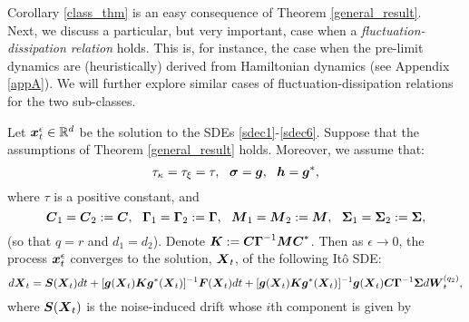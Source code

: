 Corollary \ref{class_thm} is an easy consequence of Theorem \ref{general_result}. \\

Next, we discuss a particular, but very important, case when a {\it fluctuation-dissipation relation} holds.  This is, for instance, the case when the pre-limit dynamics are (heuristically) derived from Hamiltonian dynamics (see Appendix \ref{appA}). We will further explore similar cases of fluctuation-dissipation relations for the two sub-classes.

\begin{corollary} \label{gen_fdt}
Let $\boldsymbol{x}^\epsilon_{t} \in \mathbb{R}^{d}$ be the solution to the SDEs \eqref{sdec1}-\eqref{sdec6}. Suppose that the assumptions of  Theorem \ref{general_result} holds. Moreover, we assume that:
\begin{equation} \label{fdt_con1}
\tau_{\kappa} = \tau_{\xi} = \tau,  \ \   \vecc{\sigma} =  \vecc{g},  \ \  \vecc{h} = \vecc{g}^*, \end{equation} where $\tau$ is a positive constant, and 
\begin{equation} \label{fdt_con2}
  \boldsymbol{C}_1 = \boldsymbol{C}_2 := \boldsymbol{C}, \ \ \boldsymbol{\Gamma}_1 = \boldsymbol{\Gamma}_2 := \boldsymbol{\Gamma}, \ \ \boldsymbol{M}_1 = \boldsymbol{M}_2 := \boldsymbol{M}, \ \ \boldsymbol{\Sigma}_1 = \boldsymbol{\Sigma}_2 := \boldsymbol{\Sigma},
\end{equation}
(so that $q=r$ and $d_1 =d_2$). Denote $\boldsymbol{K} := \boldsymbol{C} \boldsymbol{\Gamma}^{-1} \boldsymbol{M} \boldsymbol{C}^*$. 
Then as $\epsilon \to 0$, the process $\boldsymbol{x}^\epsilon_{t}$ converges to the solution, $\boldsymbol{X}_{t}$, of the following It\^o SDE:
\begin{equation} \label{fdtcase_limitSDE}
d\boldsymbol{X}_{t} = \boldsymbol{S}(\boldsymbol{X}_{t}) dt + [\boldsymbol{g}(\boldsymbol{X}_t) \boldsymbol{K} \boldsymbol{g}^*(\boldsymbol{X}_t)]^{-1} \boldsymbol{F}(\boldsymbol{X}_{t}) dt +  [\boldsymbol{g}(\boldsymbol{X}_t) \boldsymbol{K} \boldsymbol{g}^*(\boldsymbol{X}_t)]^{-1} \boldsymbol{g}(\boldsymbol{X}_t) \boldsymbol{C} \boldsymbol{\Gamma}^{-1} \boldsymbol{\Sigma} d\boldsymbol{W}^{(q_2)}_{t},
\end{equation}
where $\boldsymbol{S}(\boldsymbol{X}_t)$ is the noise-induced drift whose $i$th component is given by 

\end{corollary}
